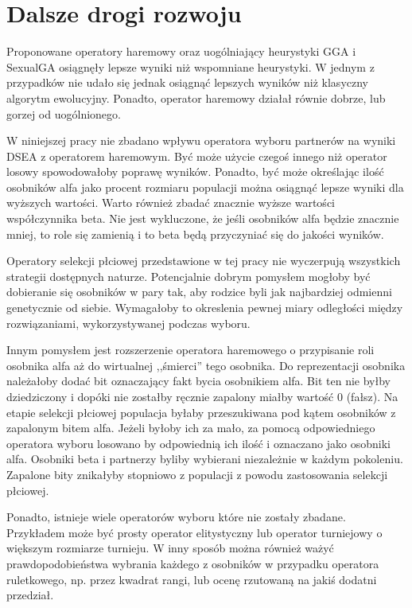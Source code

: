 \documentclass[./FM_mgr.tex]{subfiles}
\begin{document}
\chapter{Dalsze drogi rozwoju}

Proponowane operatory haremowy oraz uogólniający heurystyki GGA i SexualGA osiągnęły lepsze wyniki niż wspomniane heurystyki.
W jednym z przypadków nie udało się jednak osiągnąć lepszych wyników niż klasyczny algorytm ewolucyjny.
Ponadto, operator haremowy działał równie dobrze, lub gorzej od uogólnionego.

W niniejszej pracy nie zbadano wpływu operatora wyboru partnerów na wyniki DSEA z operatorem haremowym.
Być może użycie czegoś innego niż operator losowy spowodowałoby poprawę wyników.
Ponadto, być może określając ilość osobników alfa jako procent rozmiaru populacji można osiągnąć lepsze wyniki dla wyższych wartości.
Warto również zbadać znacznie wyższe wartości współczynnika beta.
Nie jest wykluczone, że jeśli osobników alfa będzie znacznie mniej, to role się zamienią i to beta będą przyczyniać się do jakości wyników.

Operatory selekcji płciowej przedstawione w tej pracy nie wyczerpują wszystkich strategii dostępnych naturze.
Potencjalnie dobrym pomysłem mogłoby być dobieranie się osobników w pary tak, aby rodzice byli jak najbardziej odmienni genetycznie od siebie.
Wymagałoby to okreslenia pewnej miary odległości między rozwiązaniami, wykorzystywanej podczas wyboru.

Innym pomysłem jest rozszerzenie operatora haremowego o przypisanie roli osobnika alfa aż do wirtualnej ,,śmierci'' tego osobnika.
Do reprezentacji osobnika należałoby dodać bit oznaczający fakt bycia osobnikiem alfa.
Bit ten nie byłby dziedziczony i dopóki nie zostałby ręcznie zapalony miałby wartość 0 (fałsz).
Na etapie selekcji płciowej populacja byłaby przeszukiwana pod kątem osobników z zapalonym bitem alfa.
Jeżeli byłoby ich za mało, za pomocą odpowiedniego operatora wyboru losowano by odpowiednią ich ilość i oznaczano jako osobniki alfa.
Osobniki beta i partnerzy byliby wybierani niezależnie w każdym pokoleniu.
Zapalone bity znikałyby stopniowo z populacji z powodu zastosowania selekcji płciowej.

Ponadto, istnieje wiele operatorów wyboru które nie zostały zbadane.
Przykładem może być prosty operator elitystyczny lub operator turniejowy o większym rozmiarze turnieju.
W inny sposób można również ważyć prawdopodobieństwa wybrania każdego z osobników w przypadku operatora ruletkowego, np. przez kwadrat rangi, lub ocenę rzutowaną na jakiś dodatni przedział.
\end{document}
